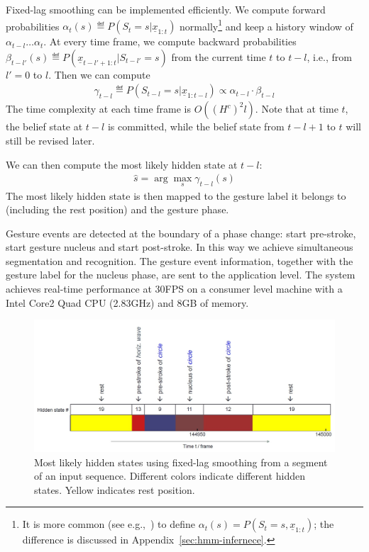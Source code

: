 Fixed-lag smoothing can be implemented efficiently. We compute forward
probabilities $\alpha_t(s) \eqdef P(S_t = s|\underline{x}_{1:t})$
normally\footnote{It is more common (see e.g.,~\cite{Rabiner90}) to define
$\alpha_t(s) = P(S_t = s, \underline{x}_{1:t})$; the difference is discussed in
Appendix~\ref{sec:hmm-infernece}.} and keep a history window of
$\alpha_{t - l}\ldots\alpha_t$.
At every time frame, we compute backward probabilities $\beta_{t-l'}(s)\eqdef
P(\underline{x}_{t-l'+1:t}|S_{t-l'}=s)$ from the current time $t$ to $t - l$,
i.e., from $l' = 0$ to $l$.
Then we can compute
\begin{align}
\gamma_{t - l} \eqdef P(S_{t-l}=s|\underline{x}_{1:t-l}) \propto \alpha_{t -
l}
\cdot
\beta_{t - l}
\end{align}  
The time complexity at each time frame is $O((H^c)^2l)$. Note that at time $t$,
the belief state at $t - l$ is committed, while the belief state from $t - l + 1$ to $t$
will still be revised later.

We can then compute the most likely hidden state at $t - l$:
\begin{align}
\hat{s} = \arg\max_s \gamma_{t - l}(s)
\end{align}
The most likely hidden state is then mapped to the gesture label it
belongs to (including the rest position) and the gesture phase. 

Gesture events are detected at the boundary of a phase change: start pre-stroke,
start gesture nucleus and start post-stroke. In this way
we achieve simultaneous segmentation and recognition. The gesture event
information, together with the gesture label for the nucleus phase, are sent to the application level.
The system achieves real-time performance at 30FPS on a consumer level machine
with a Intel Core2 Quad CPU (2.83GHz) and 8GB of memory.

\begin{figure}[t]
\centering
\includegraphics[trim=0 0 0
5mm, clip, width=\columnwidth]{figures/hidden_labeled.jpg}
\caption{Most likely hidden states using fixed-lag smoothing from a segment of
an input sequence.
Different colors indicate different hidden states. Yellow indicates rest position.}
\label{fig:visual_hidden}
\end{figure}

